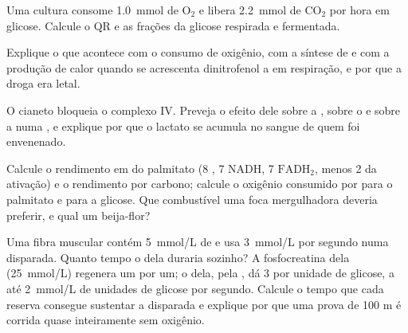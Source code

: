 \begin{exercise}[$\star\star$]\label{exo:b1:respiration-fermentation:7}
Uma cultura consome \qty{1.0}{mmol} de $\mathrm{O_2}$ e libera
\qty{2.2}{mmol} de $\mathrm{CO_2}$ por hora em glicose. Calcule o QR e
as frações da glicose respirada e fermentada.
\end{exercise}

\begin{exercise}[$\star\star$]\label{exo:b1:respiration-fermentation:8}
Explique o que acontece com o consumo de oxigênio, com a síntese de 
e com a produção de calor quando se acrescenta dinitrofenol a
 em respiração, e por que a droga era letal.
\end{exercise}

\begin{exercise}[$\star\star$]\label{exo:b1:respiration-fermentation:9}
O cianeto bloqueia o complexo IV. Preveja o efeito dele sobre a , sobre o  e sobre a  numa , e
explique por que o lactato se acumula no sangue de quem foi envenenado.
\end{exercise}

\begin{exercise}[$\star\star\star$]\label{exo:b1:respiration-fermentation:10}
Calcule o rendimento em  do palmitato (8 , 7 NADH, 7
$\mathrm{FADH_2}$, menos 2  da ativação) e o rendimento por carbono;
calcule o oxigênio consumido por  para o palmitato e para a glicose.
Que combustível uma foca mergulhadora deveria preferir, e qual um
beija-flor?
\end{exercise}

\begin{exercise}[$\star\star\star$]\label{exo:b1:respiration-fermentation:11}
Uma fibra muscular contém \qty{5}{mmol/L} de  e usa
\qty{3}{mmol/L} por segundo numa disparada. Quanto tempo o  dela
duraria sozinho? A fosfocreatina dela (\qty{25}{mmol/L}) regenera  um
por um; o  dela, pela , dá 3  por unidade de
glicose, a até \qty{2}{mmol/L} de unidades de glicose por segundo.
Calcule o tempo que cada reserva consegue sustentar a disparada e
explique por que uma prova de 100 m é corrida quase inteiramente sem
oxigênio.
\end{exercise}


